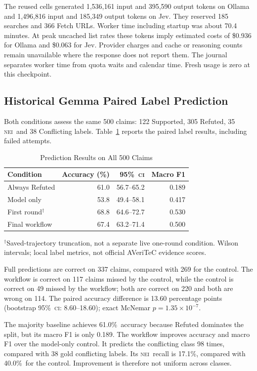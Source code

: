 \documentclass[conference]{IEEEtran}
\newcommand{\NEI}{\textsc{nei}}
\newcommand{\CI}{\textsc{ci}}
\newcommand{\pct}{\%}
\begin{document}
The reused cells generated 1,536,161 input and 395,590 output tokens on Ollama and 1,496,816 input and 185,349 output tokens on Jev. They reserved 185 searches and 366 Fetch URLs. Worker time including startup was about 70.4 minutes. At peak uncached list rates these tokens imply estimated costs of \$0.936 for Ollama and \$0.063 for Jev. Provider charges and cache or reasoning counts remain unavailable where the response does not report them. The journal separates worker time from quota waits and calendar time. Fresh usage is zero at this checkpoint.

\subsection{Historical Gemma Paired Label Prediction}
Both conditions assess the same 500 claims: 122 Supported, 305 Refuted, 35 \NEI\ and 38 Conflicting labels. Table~\ref{tab:prediction} reports the paired label results, including failed attempts.

\begin{table}[t]
\caption{Prediction Results on All 500 Claims}
\label{tab:prediction}
\centering
\footnotesize
\begin{tabular}{@{}lrrr@{}}
\toprule
Condition & Accuracy (\pct) & 95\pct\ \CI & Macro F1\\
\midrule
Always Refuted & 61.0 & 56.7--65.2 & 0.189\\
Model only & 53.8 & 49.4--58.1 & 0.417\\
First round$^{\dagger}$ & 68.8 & 64.6--72.7 & 0.530\\
Final workflow & 67.4 & 63.2--71.4 & 0.500\\
\bottomrule
\end{tabular}
\par\smallskip
\parbox{\columnwidth}{\footnotesize $^{\dagger}$Saved-trajectory truncation, not a separate live one-round condition. Wilson intervals; local label metrics, not official AVeriTeC evidence scores.}
\end{table}

Full predictions are correct on 337 claims, compared with 269 for the control. The workflow is correct on 117 claims missed by the control, while the control is correct on 49 missed by the workflow; both are correct on 220 and both are wrong on 114. The paired accuracy difference is 13.60 percentage points (bootstrap 95\pct\ \CI: 8.60--18.60); exact McNemar \(p=1.35\times 10^{-7}\).

The majority baseline achieves 61.0\pct\ accuracy because Refuted dominates the split, but its macro F1 is only 0.189. The workflow improves accuracy and macro F1 over the model-only control. It predicts the conflicting class 98 times, compared with 38 gold conflicting labels. Its \NEI\ recall is 17.1\pct, compared with 40.0\pct\ for the control. Improvement is therefore not uniform across classes.
\end{document}
